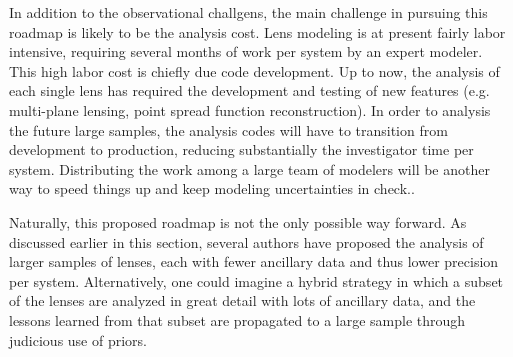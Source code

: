 In addition to the observational challgens, the main challenge in
pursuing this roadmap is likely to be the analysis cost. Lens modeling
is at present fairly labor intensive, requiring several months of work
per system by an expert modeler. This high labor cost is chiefly due
code development. Up to now, the analysis of each single lens has
required the development and testing of new features (e.g. multi-plane
lensing, point spread function reconstruction). In order to analysis
the future large samples, the analysis codes will have to transition
from development to production, reducing substantially the
investigator time per system. Distributing the work among a large team
of modelers will be another way to speed things up and keep modeling uncertainties in check..

Naturally, this proposed roadmap is not the only possible way
forward. As discussed earlier in this section, several authors have
proposed the analysis of larger samples of lenses, each with fewer
ancillary data and thus lower precision per system. Alternatively, one
could imagine a hybrid strategy in which a subset of the lenses are
analyzed in great detail with lots of ancillary data, and the lessons
learned from that subset are propagated to a large sample through
judicious use of priors.
